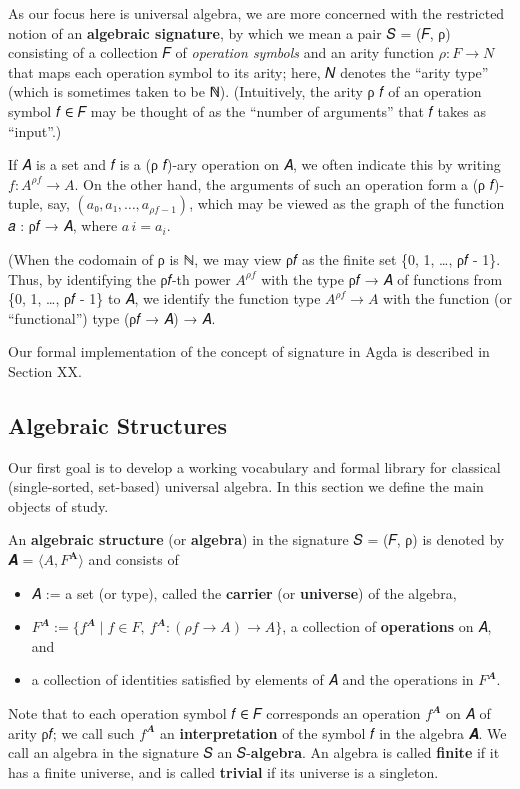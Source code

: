 \documentclass[sigplan,screen]{acmart}
\begin{document}
As our focus here is universal algebra, we are more concerned with the restricted notion of an \textbf{algebraic signature}, by which we mean a pair 𝑆 = (𝐹, ρ) consisting of a collection 𝐹 of \emph{operation symbols} and an arity function \(ρ : 𝐹 → 𝑁\) that maps each operation symbol to its arity; here, 𝑁 denotes the ``arity type'' (which is sometimes taken to be ℕ). (Intuitively, the arity ρ 𝑓 of an operation symbol 𝑓 ∈ 𝐹 may be thought of as the ``number of arguments'' that 𝑓 takes as ``input''.)

If 𝐴 is a set and 𝑓 is a (ρ 𝑓)-ary operation on 𝐴, we often indicate this by writing \(f : A^{ρ f} → A\). On the other hand, the arguments of such an operation form a (ρ 𝑓)-tuple, say, \((𝑎₀, 𝑎₁, …, a_{ρf-1})\), which may be viewed as the graph of the function 𝑎 : ρ𝑓 → 𝐴, where \(𝑎\, 𝑖 = 𝑎_i\).

(When the codomain of ρ is ℕ, we may view ρ𝑓 as the finite set \{0, 1, …, ρ𝑓 - 1\}. Thus, by identifying the ρ𝑓-th power \(A^{ρf}\) with the type ρ𝑓 → 𝐴 of functions from \{0, 1, …, ρ𝑓 - 1\} to 𝐴, we identify the function type \(A^{ρf} → A\) with the function (or ``functional'') type (ρ𝑓 → 𝐴) → 𝐴.

Our formal implementation of the concept of signature in Agda is described in Section XX.

\subsection{Algebraic Structures}\label{algebraic-structures}
Our first goal is to develop a working vocabulary and formal library for classical (single-sorted, set-based) universal algebra. In this section we define the main objects of study.


An \textbf{algebraic structure} (or \textbf{algebra}) in the signature 𝑆 = (𝐹, ρ) is denoted by 𝑨 = \( ⟨A, F^{\mathbf A}⟩\) and consists of

\begin{itemize}
\item 𝐴 := a set (or type), called the \textbf{carrier} (or \textbf{universe}) of the algebra,
\item \(F^𝑨 := \{ f^𝑨 ∣ f ∈ F, \ f^𝑨 : (ρ𝑓 → A) → A \}\), a collection of \textbf{operations} on 𝐴, and
\item a collection of identities satisfied by elements of 𝐴 and the operations in \(F^𝑨\).
\end{itemize}

Note that to each operation symbol 𝑓 ∈ 𝐹 corresponds an operation \(f^𝑨\) on 𝐴 of arity ρ𝑓; we call such \(f^𝑨\) an
\textbf{interpretation} of the symbol 𝑓 in the algebra 𝑨. We call an algebra in the signature 𝑆 an 𝑆-\textbf{algebra}. An algebra is called \textbf{finite} if it has a finite universe, and is called \textbf{trivial} if its universe is a singleton.
\end{document}
